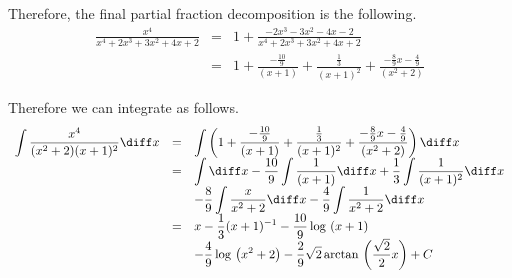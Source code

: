 {Therefore, the final partial fraction decomposition is the following. 
\[\begin{array}{rcl}
\displaystyle \frac{x^{4}}{x^{4}+2x^{3}+3x^{2}+4x +2}&=&\displaystyle 1+ \frac{-2x^{3}- 3x^{2}-4x -2}{x^{4}+2x^{3}+3x^{2}+4x +2}\\
&=&\displaystyle 1+ \frac{-\frac{10}{9}}{(x +1)}+\frac{\frac{1}{3}}{(x +1)^{2}}+\frac{-\frac{8}{9}x -\frac{4}{9}}{(x^{2}+2)}
\end{array}
\]

Therefore we can integrate as follows.
\[
\begin{array}{rcl}
\displaystyle \int \frac{x^4}{(x^2+2)(x+1)^2} \diff x &=&\displaystyle \int \left( 1+ \frac{-\frac{10}{9}}{(x +1)}+\frac{\frac{1}{3}}{(x +1)^{2}}+\frac{-\frac{8}{9}x -\frac{4}{9}}{(x^{2}+2)}\right)\diff x\\
&=&\displaystyle \int \diff x-\frac{10}{9}\int \frac{1}{(x +1)}\diff x + \frac{ 1}{3}\int \frac{ 1}{(x +1)^{2}}\diff x \\
&&\displaystyle -\frac{8}{9} \int \frac{x}{x^{2}+2}\diff x-\frac{4}{9} \int \frac{ 1}{x^{2}+2}\diff x \\
&=&\displaystyle x -\frac{1}{3} (x+1)^{-1}-\frac{10}{9} \log{}\left(x+1\right)\\
&&\displaystyle -\frac{4}{9} \log{}\left(x^{2} +2\right) -\frac{ 2}{ 9} \sqrt{ 2} \arctan{}\left(\frac{\sqrt{2}}{2} x\right)+C
\end{array}
\]
}

